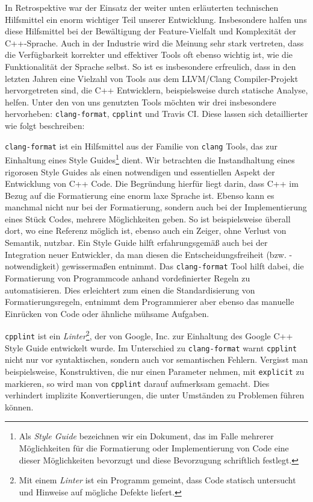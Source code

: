 In Retrospektive war der Einsatz der weiter unten erläuterten technischen
Hilfsmittel ein enorm wichtiger Teil unserer Entwicklung. Insbesondere halfen
uns diese Hilfsmittel bei der Bewältigung der Feature-Vielfalt und Komplexität
der C++-Sprache. Auch in der Industrie wird die Meinung sehr stark vertreten,
dass die Verfügbarkeit korrekter und effektiver Tools oft ebenso wichtig ist,
wie die Funktionalität der Sprache selbst. So ist es insbesondere erfreulich,
dass in den letzten Jahren eine Vielzahl von Tools aus dem LLVM/Clang
Compiler-Projekt hervorgetreten sind, die C++ Entwicklern, beispielsweise durch
statische Analyse, helfen. Unter den von uns genutzten Tools möchten wir drei
insbesondere hervorheben: \texttt{clang-format}, \texttt{cpplint} und Travis CI.
Diese lassen sich detaillierter wie folgt beschreiben:
\begin{sitemize}{-0.6cm}
  \item \texttt{clang-format} ist ein Hilfsmittel aus der Familie von
  \texttt{clang} Tools, das zur Einhaltung eines Style Guides\footnote{Als
  \emph{Style Guide} bezeichnen wir ein Dokument, das im Falle mehrerer
  Möglichkeiten für die Formatierung oder Implementierung von Code eine dieser
  Möglichkeiten bevorzugt und diese Bevorzugung schriftlich festlegt.} dient.
  Wir betrachten die Instandhaltung eines rigorosen Style Guides als einen
  notwendigen und essentiellen Aspekt der Entwicklung von C++ Code. Die
  Begründung hierfür liegt darin, dass C++ im Bezug auf die Formatierung eine
  enorm laxe Sprache ist. Ebenso kann es manchmal nicht nur bei der
  Formatierung, sondern auch bei der Implementierung eines Stück Codes, mehrere
  Möglichkeiten geben. So ist beispielsweise überall dort, wo eine Referenz
  möglich ist, ebenso auch ein Zeiger, ohne Verlust von Semantik, nutzbar. Ein
  Style Guide hilft erfahrungsgemäß auch bei der Integration neuer Entwickler,
  da man diesen die Entscheidungsfreiheit (bzw. -notwendigkeit) gewissermaßen
  entnimmt. Das \texttt{clang-format} Tool hilft dabei, die Formatierung von
  Programmcode anhand vordefinierter Regeln zu automatisieren. Dies erleichtert
  zum einen die Standardisierung von Formatierungsregeln, entnimmt dem
  Programmierer aber ebenso das manuelle Einrücken von Code oder ähnliche
  mühsame Aufgaben.
  \vspace{0.3cm}

  \item \texttt{cpplint} ist ein \emph{Linter}\footnote{Mit einem \emph{Linter}
  ist ein Programm gemeint, dass Code statisch untersucht und Hinweise auf
  mögliche Defekte liefert.}, der von Google, Inc. zur Einhaltung des Google C++
  Style Guide entwickelt wurde. Im Unterschied zu \texttt{clang-format} warnt
  \texttt{cpplint} nicht nur vor syntaktischen, sondern auch vor semantischen
  Fehlern. Vergisst man beispielsweise, Konstruktiven, die nur einen Parameter
  nehmen, mit \texttt{explicit} zu markieren, so wird man von \texttt{cpplint}
  darauf aufmerksam gemacht. Dies verhindert implizite Konvertierungen, die
  unter Umständen zu Problemen führen können.


\end{sitemize}

